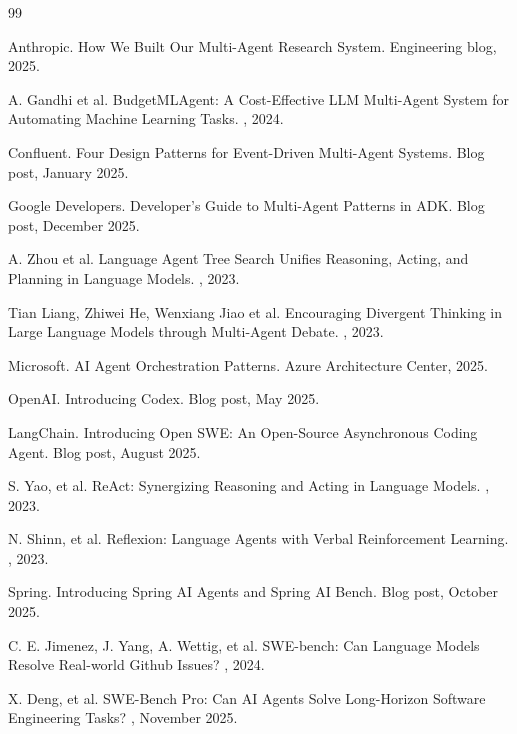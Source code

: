 \begin{thebibliography}{99}

Anthropic.
\newblock How We Built Our Multi-Agent Research System.
\newblock Engineering blog, 2025.

A. Gandhi et al.
\newblock BudgetMLAgent: A Cost-Effective LLM Multi-Agent System for Automating Machine Learning Tasks.
, 2024.

Confluent.
\newblock Four Design Patterns for Event-Driven Multi-Agent Systems.
\newblock Blog post, January 2025.

Google Developers.
\newblock Developer's Guide to Multi-Agent Patterns in ADK.
\newblock Blog post, December 2025.

A. Zhou et al.
\newblock Language Agent Tree Search Unifies Reasoning, Acting, and Planning in Language Models.
, 2023.

Tian Liang, Zhiwei He, Wenxiang Jiao et al.
\newblock Encouraging Divergent Thinking in Large Language Models through Multi-Agent Debate.
, 2023.

Microsoft.
\newblock AI Agent Orchestration Patterns.
\newblock Azure Architecture Center, 2025.

OpenAI.
\newblock Introducing Codex.
\newblock Blog post, May 2025.

LangChain.
\newblock Introducing Open SWE: An Open-Source Asynchronous Coding Agent.
\newblock Blog post, August 2025.

S. Yao, et al.
\newblock ReAct: Synergizing Reasoning and Acting in Language Models.
, 2023.

N. Shinn, et al.
\newblock Reflexion: Language Agents with Verbal Reinforcement Learning.
, 2023.

Spring.
\newblock Introducing Spring AI Agents and Spring AI Bench.
\newblock Blog post, October 2025.

C. E. Jimenez, J. Yang, A. Wettig, et al.
\newblock SWE-bench: Can Language Models Resolve Real-world Github Issues?
, 2024.

X. Deng, et al.
\newblock SWE-Bench Pro: Can AI Agents Solve Long-Horizon Software Engineering Tasks?
, November 2025.


\end{thebibliography}
